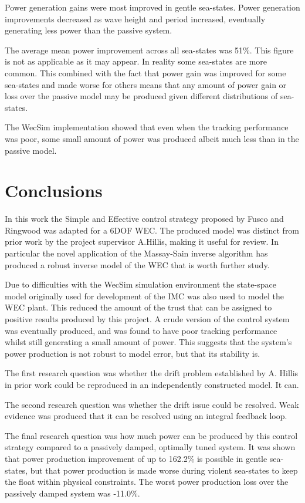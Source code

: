 \documentclass{report}
\begin{document}
Power generation gains were most improved in gentle sea-states. Power generation improvements decreased as wave height and period increased, eventually generating less power than the passive system.

The average mean power improvement across all sea-states was 51\%. This figure is not as applicable as it may appear. In reality some sea-states are more common. This combined with the fact that power gain was improved for some sea-states and made worse for others means that any amount of power gain or loss over the passive model may be produced given different distributions of sea-states.

The WecSim implementation showed that even when the tracking performance was poor, some small amount of power was produced albeit much less than in the passive model.

\chapter{Conclusions}
In this work the Simple and Effective control strategy proposed by Fusco and Ringwood\cite{ringwood} was adapted for a 6DOF WEC. The produced model was distinct from prior work by the project supervisor A.Hillis, making it useful for review. In particular the novel application of the Massay-Sain inverse algorithm has produced a robust inverse model of the WEC that is worth further study.

Due to difficulties with the WecSim simulation environment the state-space model originally used for development of the IMC was also used to model the WEC plant. This reduced the amount of the trust that can be assigned to positive results produced by this project. A crude version of the control system was eventually produced, and was found to have poor tracking performance whilst still generating a small amount of power. This suggests that the system's power production is not robust to model error, but that its stability is.

The first research question was whether the drift problem established by A. Hillis in prior work could be reproduced in an independently constructed model. It can.

The second research question was whether the drift issue could be resolved. Weak evidence was produced that it can be resolved using an integral feedback loop.

The final research question was how much power can be produced by this control strategy compared to a passively damped, optimally tuned system. It was shown that power production improvement of up to 162.2\% is possible in gentle sea-states, but that power production is made worse during violent sea-states to keep the float within physical constraints. The worst power production loss over the passively damped system was -11.0\%.
\end{document}
